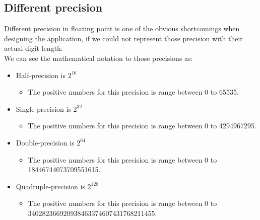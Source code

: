 \documentclass[11pt]{article}
\begin{document}
\subsection{Different precision}%
Different precision in floating point is one of the obvious shortcomings when designing the application, if we could not represent those precision with their actual digit length.\\
We can see the mathematical notation to those precisions as:
\begin{itemize}
\item{Half-precision is $2^{16}$}
\begin{itemize}\item[]{The positive numbers for this precision is range between 0 to 65535.}\end{itemize}
\item{Single-precision is $2^{32}$}
\begin{itemize}\item[]{The positive numbers for this precision is range between 0 to 4294967295.}\end{itemize}
\item{Double-precision is $2^{64}$}
\begin{itemize}\item[]{The positive numbers for this precision is range between 0 to 18446744073709551615.}\end{itemize}
\item{Quadruple-precision is $2^{128}$}
\begin{itemize}\item[]{The positive numbers for this precision is range between 0 to \\340282366920938463374607431768211455.}\end{itemize}
\end{itemize}
\end{document}
